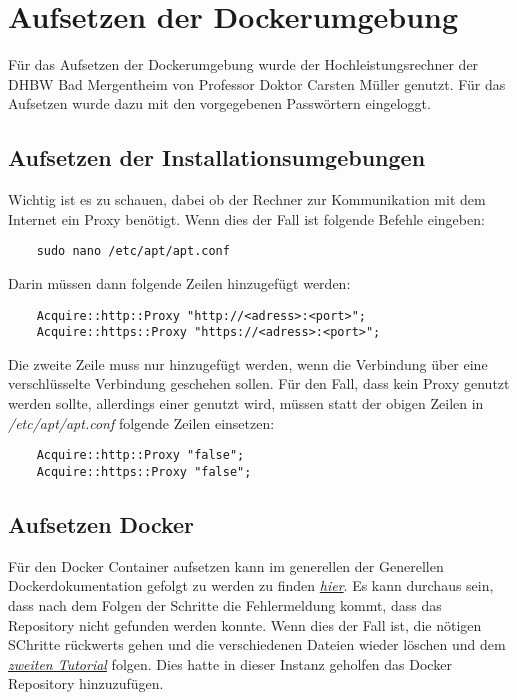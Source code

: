 \chapter{Aufsetzen der Dockerumgebung}
Für das Aufsetzen der Dockerumgebung wurde der Hochleistungsrechner der DHBW Bad Mergentheim von Professor Doktor Carsten Müller genutzt. Für das Aufsetzen wurde dazu mit den vorgegebenen Passwörtern eingeloggt. 
\section{Aufsetzen der Installationsumgebungen}
Wichtig ist es zu schauen, dabei ob der Rechner zur Kommunikation mit dem Internet ein Proxy benötigt. Wenn dies der Fall ist folgende Befehle eingeben:

\begin{verbatim}
    sudo nano /etc/apt/apt.conf
\end{verbatim}
Darin müssen dann folgende Zeilen hinzugefügt werden:
\begin{verbatim}
    Acquire::http::Proxy "http://<adress>:<port>";
    Acquire::https::Proxy "https://<adress>:<port>";
\end{verbatim}
Die zweite Zeile muss nur hinzugefügt werden, wenn die Verbindung über eine verschlüsselte Verbindung geschehen sollen. Für den Fall, dass kein Proxy genutzt werden sollte, allerdings einer genutzt wird, müssen statt der obigen Zeilen in \textit{/etc/apt/apt.conf} folgende Zeilen einsetzen:
\begin{verbatim}
    Acquire::http::Proxy "false";
    Acquire::https::Proxy "false";
\end{verbatim}

\section{Aufsetzen Docker}
Für den Docker Container aufsetzen kann im generellen der Generellen Dockerdokumentation gefolgt zu werden zu finden \textit{\href{https://docs.docker.com/desktop/install/ubuntu/}{hier}}. Es kann durchaus sein, dass nach dem Folgen der Schritte die Fehlermeldung kommt, dass das Repository nicht gefunden werden konnte. Wenn dies der Fall ist, die nötigen SChritte rückwerts gehen und die verschiedenen Dateien wieder löschen und dem \textit{\href{https://www.digitalocean.com/community/tutorials/how-to-install-and-use-docker-on-ubuntu-20-04}{zweiten Tutorial}} folgen. Dies hatte in dieser Instanz geholfen das Docker Repository hinzuzufügen.

